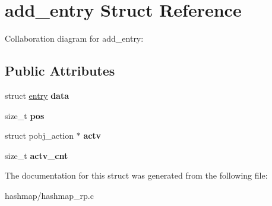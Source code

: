 \hypertarget{structadd__entry}{}\section{add\+\_\+entry Struct Reference}
\label{structadd__entry}


Collaboration diagram for add\+\_\+entry\+:
\subsection*{Public Attributes}
\begin{DoxyCompactItemize}
\item 
\mbox{\label{structadd__entry_ada303ac47bbd298d31a08ff5fb0c8d48}} 
struct \hyperlink{structentry}{entry} {\bfseries data}
\item 
\mbox{\label{structadd__entry_aff20888396f928a47207ec2fe432efe9}} 
size\+\_\+t {\bfseries pos}
\item 
\mbox{\label{structadd__entry_a02a8967aa6cd3e8bbbaa6c35571379a2}} 
struct pobj\+\_\+action $\ast$ {\bfseries actv}
\item 
\mbox{\label{structadd__entry_a288eb722a38cd8a357d0600475defe70}} 
size\+\_\+t {\bfseries actv\+\_\+cnt}
\end{DoxyCompactItemize}


The documentation for this struct was generated from the following file\+:\begin{DoxyCompactItemize}
\item 
hashmap/hashmap\+\_\+rp.\+c\end{DoxyCompactItemize}
